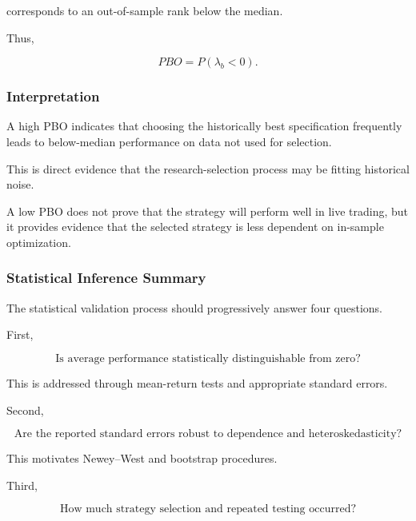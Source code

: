 \documentclass[11pt,a4paper]{article}
\begin{document}
corresponds to an out-of-sample rank below the median.

Thus,

\begin{equation}
\boxed{
PBO
=
P(\lambda_b<0).
}
\end{equation}


\subsubsection{Interpretation}

A high PBO indicates that choosing the historically best specification frequently
leads to below-median performance on data not used for selection.

This is direct evidence that the research-selection process may be fitting
historical noise.

A low PBO does not prove that the strategy will perform well in live trading,
but it provides evidence that the selected strategy is less dependent on
in-sample optimization.


\subsubsection{Statistical Inference Summary}

The statistical validation process should progressively answer four questions.

First,

\begin{equation}
\boxed{
\text{Is average performance statistically distinguishable from zero?}
}
\end{equation}

This is addressed through mean-return tests and appropriate standard errors.

Second,

\begin{equation}
\boxed{
\text{Are the reported standard errors robust to dependence and
heteroskedasticity?}
}
\end{equation}

This motivates Newey--West and bootstrap procedures.

Third,

\begin{equation}
\boxed{
\text{How much strategy selection and repeated testing occurred?}
}
\end{equation}
\end{document}
